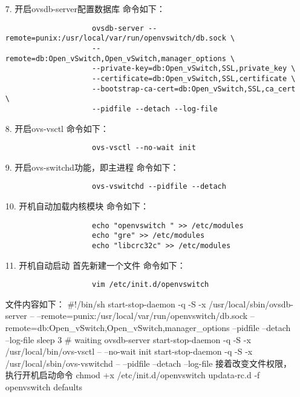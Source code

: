 \documentclass[a4paper,left=1.5cm,right=1.5cm,11pt]{article}
\begin{document}
\begin{itemize}
\begin{lstlisting}
				 \end{lstlisting}
		\item[7.]开启ovsdb-server配置数据库
				命令如下：
				 \begin{lstlisting}
					ovsdb-server --remote=punix:/usr/local/var/run/openvswitch/db.sock \
					--remote=db:Open_vSwitch,Open_vSwitch,manager_options \
					--private-key=db:Open_vSwitch,SSL,private_key \
					--certificate=db:Open_vSwitch,SSL,certificate \
					--bootstrap-ca-cert=db:Open_vSwitch,SSL,ca_cert \
					--pidfile --detach --log-file
				 \end{lstlisting}
		\item[8.]开启ovs-vsctl
				命令如下：
				 \begin{lstlisting}
					ovs-vsctl --no-wait init
				 \end{lstlisting}
		\item[9.]开启ovs-switchd功能，即主进程
				命令如下：
				 \begin{lstlisting}
					ovs-vswitchd --pidfile --detach
				 \end{lstlisting}
		\item[10.]开机自动加载内核模块
				命令如下：
				 \begin{lstlisting}
					echo "openvswitch " >> /etc/modules
					echo "gre" >> /etc/modules
					echo "libcrc32c" >> /etc/modules
				 \end{lstlisting}
		\item[11.]开机自动启动
				首先新建一个文件
				命令如下：
				 \begin{lstlisting}
					vim /etc/init.d/openvswitch
				 \end{lstlisting}
				文件内容如下：
				#!/bin/sh
				start-stop-daemon -q -S -x /usr/local/sbin/ovsdb-server -- --remote=punix:/usr/local/var/run/openvswitch/db.sock --remote=db:Open_vSwitch,Open_vSwitch,manager_options --pidfile --detach --log-file
				sleep 3 # waiting ovsdb-server 
				start-stop-daemon -q -S -x /usr/local/bin/ovs-vsctl -- --no-wait init
				start-stop-daemon -q -S -x /usr/local/sbin/ovs-vswitchd -- --pidfile --detach --log-file
				接着改变文件权限，执行开机启动命令
				chmod +x /etc/init.d/openvswitch
				updata-rc.d -f openvswitch defaults
	\end{itemize}
\end{document}
